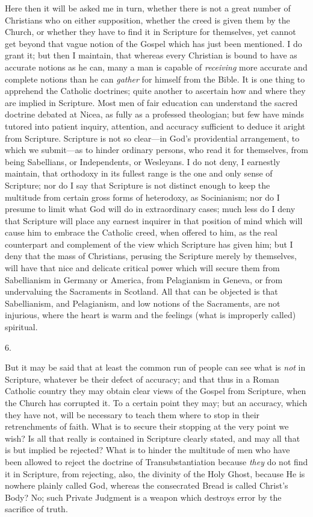 Here then it will be asked me in turn, whether there is not a great
number of Christians who on either supposition, whether the creed is
given them by the Church, or whether they have to find it in Scripture
for themselves, yet cannot get beyond that vague notion of the Gospel
which has just been mentioned. I do grant it; but then I maintain,
that whereas every Christian is bound to have as accurate notions as
he can, many a man is capable of \emph{receiving} more accurate and
complete notions than he can \emph{gather} for himself from the Bible.
It is one thing to apprehend the Catholic doctrines; quite another to
ascertain how and where they are implied in Scripture. Most men of
fair education can understand the sacred doctrine debated at Nicea, as
fully as a professed theologian; but few have minds tutored into
patient inquiry, attention, and accuracy sufficient to deduce it
aright from Scripture. Scripture is not so clear—in God's
providential arrangement, to which we submit—as to hinder ordinary
persons, who read it for themselves, from being Sabellians, or
Independents, or Wesleyans. I do not deny, I earnestly maintain, that
orthodoxy in its fullest range is the one and only sense of Scripture;
nor do I say that Scripture is not distinct enough to keep the
multitude from certain gross forms of heterodoxy, as Socinianism; nor
do I presume to limit what God will do in extraordinary cases; much
less do I deny that Scripture will place any earnest inquirer in that
position of mind which will cause him to embrace the Catholic creed,
when offered to him, as the real counterpart and complement of the
view which Scripture has given him; but I deny that the mass of
Christians, perusing the Scripture merely by themselves, will
have that nice and delicate critical power which will secure them from
Sabellianism in Germany or America, from Pelagianism in Geneva, or
from undervaluing the Sacraments in Scotland. All that can be objected
is that Sabellianism, and Pelagianism, and low notions of the
Sacraments, are not injurious, where the heart is warm and the
feelings (what is improperly called) spiritual.

6.

But it may be said that at least the common run of people can see
what is \emph{not} in Scripture, whatever be their defect of accuracy;
and that thus in a Roman Catholic country they may obtain clear views
of the Gospel from Scripture, when the Church has corrupted it. To a
certain point they may; but an accuracy, which they have not, will be
necessary to teach them where to stop in their retrenchments of faith.
What is to secure their stopping at the very point we wish? Is all
that really is contained in Scripture clearly stated, and may all that
is but implied be rejected? What is to hinder the multitude of men who
have been allowed to reject the doctrine of Transubstantiation because
\emph{they} do not find it in Scripture, from rejecting, also, the
divinity of the Holy Ghost, because He is nowhere plainly called God,
whereas the consecrated Bread is called Christ's Body? No; such
Private Judgment is a weapon which destroys error by the sacrifice of
truth.

